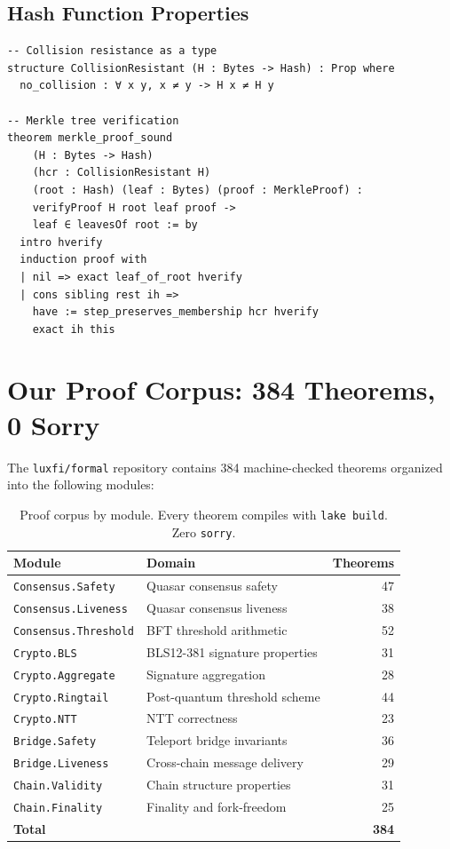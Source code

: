 \documentclass[11pt,a4paper]{article}
\begin{document}
\subsection{Hash Function Properties}

\begin{lstlisting}[language=Lean,caption={Hash function model}]
-- Collision resistance as a type
structure CollisionResistant (H : Bytes -> Hash) : Prop where
  no_collision : ∀ x y, x ≠ y -> H x ≠ H y

-- Merkle tree verification
theorem merkle_proof_sound
    (H : Bytes -> Hash)
    (hcr : CollisionResistant H)
    (root : Hash) (leaf : Bytes) (proof : MerkleProof) :
    verifyProof H root leaf proof ->
    leaf ∈ leavesOf root := by
  intro hverify
  induction proof with
  | nil => exact leaf_of_root hverify
  | cons sibling rest ih =>
    have := step_preserves_membership hcr hverify
    exact ih this
\end{lstlisting}

\section{Our Proof Corpus: 384 Theorems, 0 Sorry}

The \texttt{luxfi/formal} repository contains 384 machine-checked theorems organized
into the following modules:

\begin{table}[H]
\centering
\small
\begin{tabular}{@{}llr@{}}
\toprule
\textbf{Module} & \textbf{Domain} & \textbf{Theorems} \\
\midrule
\texttt{Consensus.Safety} & Quasar consensus safety & 47 \\
\texttt{Consensus.Liveness} & Quasar consensus liveness & 38 \\
\texttt{Consensus.Threshold} & BFT threshold arithmetic & 52 \\
\texttt{Crypto.BLS} & BLS12-381 signature properties & 31 \\
\texttt{Crypto.Aggregate} & Signature aggregation & 28 \\
\texttt{Crypto.Ringtail} & Post-quantum threshold scheme & 44 \\
\texttt{Crypto.NTT} & NTT correctness & 23 \\
\texttt{Bridge.Safety} & Teleport bridge invariants & 36 \\
\texttt{Bridge.Liveness} & Cross-chain message delivery & 29 \\
\texttt{Chain.Validity} & Chain structure properties & 31 \\
\texttt{Chain.Finality} & Finality and fork-freedom & 25 \\
\bottomrule
\textbf{Total} & & \textbf{384} \\
\bottomrule
\end{tabular}
\caption{Proof corpus by module. Every theorem compiles with \texttt{lake build}. Zero \texttt{sorry}.}
\end{table}
\end{document}
